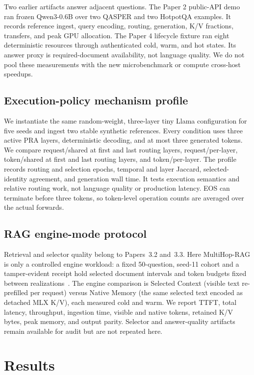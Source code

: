 \documentclass[11pt]{article}
\begin{document}
Two earlier artifacts answer adjacent questions.  The Paper 2 public-API demo
ran frozen Qwen3-0.6B over two QASPER and two HotpotQA examples.  It records
reference ingest, query encoding, routing, generation, K/V fractions, transfers,
and peak GPU allocation.  The Paper 4 lifecycle fixture ran eight deterministic
resources through authenticated cold, warm, and hot states.  Its answer proxy
is required-document availability, not language quality.  We do not pool these
measurements with the new microbenchmark or compute cross-host speedups.

\subsection{Execution-policy mechanism profile}

We instantiate the same random-weight, three-layer tiny Llama configuration for
five seeds and ingest two stable synthetic references. Every condition uses
three active PRA layers, deterministic decoding, and at most three generated
tokens. We compare request/shared at first and last routing layers,
request/per-layer, token/shared at first and last routing layers, and
token/per-layer. The profile records routing and selection epochs, temporal and
layer Jaccard, selected-identity agreement, and generation wall time. It tests
execution semantics and relative routing work, not language quality or
production latency. EOS can terminate before three tokens, so token-level
operation counts are averaged over the actual forwards.

\subsection{RAG engine-mode protocol}

Retrieval and selector quality belong to Papers~3.2 and~3.3.  Here MultiHop-RAG
is only a controlled engine workload: a fixed 50-question, seed-11 cohort and a
tamper-evident receipt hold selected document intervals and token budgets fixed
between realizations~\cite{tang2024multihoprag}.  The engine comparison is
Selected Context (visible text re-prefilled per request) versus Native Memory
(the same selected text encoded as detached MLX K/V), each measured cold and
warm.  We report TTFT, total latency, throughput, ingestion time, visible and
native tokens, retained K/V bytes, peak memory, and output parity.  Selector and
answer-quality artifacts remain available for audit but are not repeated here.

\section{Results}
\end{document}
